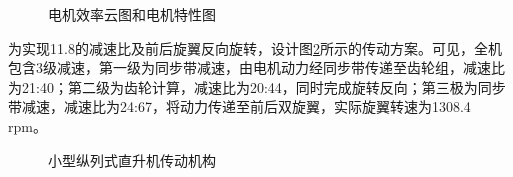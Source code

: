 \begin{figure}[htb!]
    \centering
    \quad
    \caption{电机效率云图和电机特性图\label{fig:chap7:motor}}
\end{figure}

为实现11.8的减速比及前后旋翼反向旋转，设计图\ref{fig:chap7:transfer}所示的传动方案。可见，全机包含3级减速，第一级为同步带减速，由电机动力经同步带传递至齿轮组，减速比为21:40；第二级为齿轮计算，减速比为20:44，同时完成旋转反向；第三极为同步带减速，减速比为24:67，将动力传递至前后双旋翼，实际旋翼转速为1308.4 rpm。
\begin{figure}[htb!]
    \centering
    \quad
    \quad
    \caption{小型纵列式直升机传动机构\label{fig:chap7:transfer}}
\end{figure}

